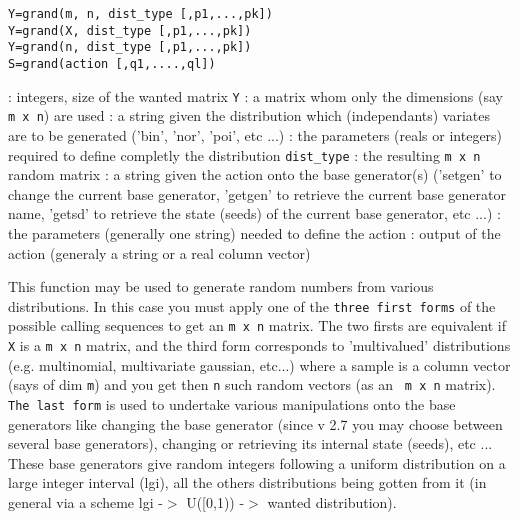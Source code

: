 \begin{mandesc}
\end{mandesc}
  \begin{calling_sequence}
    \begin{verbatim}
Y=grand(m, n, dist_type [,p1,...,pk])  
Y=grand(X, dist_type [,p1,...,pk])  
Y=grand(n, dist_type [,p1,...,pk])  
S=grand(action [,q1,....,ql])  
    \end{verbatim}
  \end{calling_sequence}
  \begin{parameters}
  \begin{varlist}
    : integers, size of the wanted matrix \verb!Y!
   : a matrix whom only the dimensions (say \verb!m x n!) are used
   : a string given the distribution which (independants) variates are to be 
     generated ('bin', 'nor', 'poi', etc ...)
   : the parameters (reals or integers) required to define completly the distribution 
    \verb!dist_type!
   : the resulting \verb!m x n! random matrix
   : a string given the action onto the base generator(s) ('setgen' to change the current base 
     generator,  'getgen' to retrieve the current base generator name, 'getsd' to retrieve the 
     state (seeds) of the current base generator, etc ...)
    : the parameters (generally one string) needed to define the action
    : output of the action (generaly a string or a real column vector)
  \end{varlist}
  \end{parameters}
  
\begin{mandescription}
  This function may be used to generate random numbers from various distributions. In this 
  case you must apply one of the 
  \verb!three first forms! of the possible calling sequences to get an \verb!m x n! matrix. 
  The two firsts are equivalent if \verb!X! is a \verb!m x n! matrix, 
  and the third form corresponds to 'multivalued' distributions (e.g. multinomial, multivariate
  gaussian, etc...) where a sample is a column vector (says of dim \verb!m!)
  and you get then \verb!n! such random vectors (as an \verb! m x n! matrix). 
  \verb!The last form! is used to undertake various manipulations onto the base generators
  like changing the base generator (since v 2.7 you may choose between several base generators), 
  changing or retrieving its internal state (seeds), etc ... These base generators give random
  integers following a uniform distribution on a large integer interval (lgi), all the others 
  distributions being gotten from it (in general via a scheme lgi -$>$ U([0,1)) -$>$ wanted distribution).
\end{mandescription}

